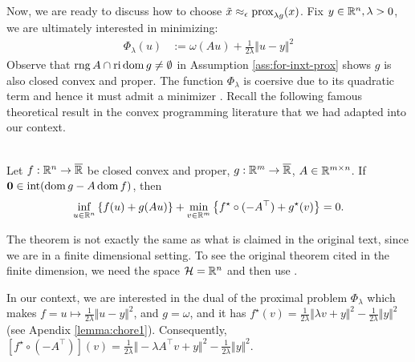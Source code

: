 \documentclass[12pt]{article}
\DeclareMathOperator{\rng}{\mathop{rng}}
\begin{document}
        Now, we are ready to discuss how to choose $\tilde x \approx_\epsilon \operatorname{prox}_{\lambda g}(x)$. 
        Fix $y \in \mathbb R^n, \lambda > 0$, we are ultimately interested in minimizing: 
        \begin{align}\label{eqn:primal-pp}
            \Phi_\lambda(u) &:= \omega(Au) + \frac{1}{2\lambda} \Vert u - y\Vert^2
        \end{align}
        Observe that $\rng A \cap \reli\dom g \neq\emptyset$ in Assumption \ref{ass:for-inxt-prox} shows $g$ is also closed convex and proper. 
        The function $\Phi_\lambda$ is coersive due to its quadratic term and hence it must admit a minimizer \cite[Theorem 1.9]{rockafellar_variational_1998}. 
        Recall the following famous theoretical result in the convex programming literature that we had adapted into our context. 
        \begin{fact}\;\label{fact:fn-rck-duality}\\
            Let $f:\mathbb R^n \rightarrow \overline {\mathbb R}$ be closed convex and proper, $g: \mathbb R^m \rightarrow \overline {\mathbb R}$, $A \in \mathbb R^{m \times n}$. 
            If ${\mathbf 0 \in \operatorname{int}(\operatorname{dom} g - A \operatorname{dom} f)}$, then 
            \begin{align*}
                \inf_{u\in \mathbb R^n}\left\lbrace
                    f(u) + g(Au)
                \right\rbrace 
                + \min_{v \in \mathbb R^m}\left\lbrace
                    f^\star\circ(-A^\top) + g^\star(v)
                \right\rbrace = 0. 
            \end{align*}
        \end{fact}
        \begin{remark}
            The theorem is not exactly the same as what is claimed in the original text, since we are in a finite dimensional setting.
            To see the original theorem cited in the finite dimension, we need the space $\mathcal H = \mathbb R^n$ and then use \cite[Proposition 6.12]{bauschke_convex_2017}. 
        \end{remark}
        In our context, we are interested in the dual of the proximal problem $\Phi_\lambda$ which makes $f = u \mapsto \frac{1}{2\lambda}\Vert u - y\Vert^2$, and $g = \omega$, and it has $f^\star(v) = \frac{1}{2\lambda}\Vert \lambda v + y\Vert^2 - \frac{1}{2\lambda}\Vert y\Vert^2$ (see Apendix \ref{lemma:chore1}). 
        Consequently, $[f^\star \circ (- A^\top)](v) = \frac{1}{2\lambda}\Vert -\lambda A^\top v  + y\Vert^2 - \frac{1}{2\lambda}\Vert y\Vert^2$. 
\end{document}
